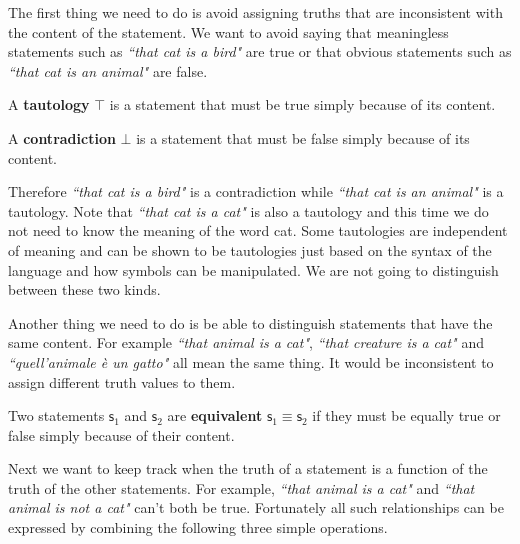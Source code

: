 \documentclass[11pt,letterpaper,fleqn]{memoir} %
\begin{document}
The first thing we need to do is avoid assigning truths that are inconsistent with the content of the statement.  We want to avoid saying that meaningless statements such as \emph{``that cat is a bird"} are true or that obvious statements such as \emph{``that cat is an animal"} are false.

\begin{mathSection}
	
	\begin{defn}
		A \textbf{tautology} $\top$ is a statement that must be true simply because of its content.
	\end{defn}
	
	\begin{defn}
		A \textbf{contradiction} $\bot$ is a statement that must be false simply because of its content.
	\end{defn}
	
\end{mathSection}

Therefore \emph{``that cat is a bird"} is a contradiction while \emph{``that cat is an animal"} is a tautology. Note that \emph{``that cat is a cat"} is also a tautology and this time we do not need to know the meaning of the word cat. Some tautologies are independent of meaning and can be shown to be tautologies just based on the syntax of the language and how symbols can be manipulated. We are not going to distinguish between these two kinds.

Another thing we need to do is be able to distinguish statements that have the same content. For example \emph{``that animal is a cat"}, \emph{``that creature is a cat"} and \emph{``quell'animale \`{e} un gatto"} all mean the same thing. It would be inconsistent to assign different truth values to them.

\begin{mathSection}

\begin{defn}
	Two statements $\mathsf{s}_1$ and $\mathsf{s}_2$ are \textbf{equivalent} $\mathsf{s}_1 \equiv \mathsf{s}_2$ if they must be equally true or false simply because of their content.
\end{defn}

\end{mathSection}

Next we want to keep track when the truth of a statement is a function of the truth of the other statements. For example, \emph{``that animal is a cat"} and \emph{``that animal is not a cat"} can't both be true. Fortunately all such relationships can be expressed by combining the following three simple operations.
\end{document}
